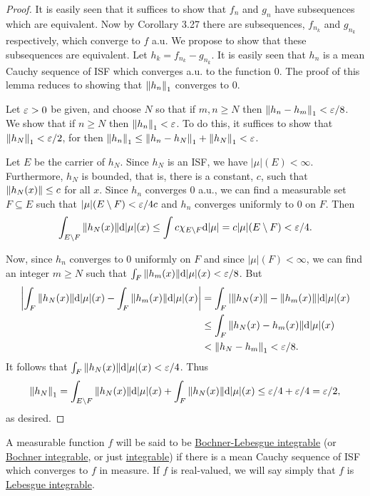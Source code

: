 \begin{proof}
It is easily seen that it suffices to show that $f_n$ and $g_n$ have subsequences which are equivalent. Now by Corollary 3.27 there are subsequences, $f_{n_k}$ and $g_{n_k}$ respectively, which converge to $f$ a.u. We propose to show that these subsequences are equivalent. Let $h_k=f_{n_k}-g_{n_k}$. It is easily seen that $h_n$ is a mean Cauchy sequence of ISF which converges a.u. to the function 0. The proof of this lemma reduces to showing that $\norm{h_n}_1$ converges to $0$.

Let $\varepsilon>0$ be given, and choose $N$ so that if $m,n\geq N$ then $\norm{h_n-h_m}_1<\varepsilon/8$. We show that if $n\geq N$ then $\norm{h_n}_1<\varepsilon$. To do this, it suffices to show that $\norm{h_N}_1<\varepsilon/2$, for then $\norm{h_n}_1\leq\norm{h_n-h_N}_1+\norm{h_N}_1<\varepsilon$.

Let $E$ be the carrier of $h_N$. Since $h_N$ is an ISF, we have $|\mu|(E)<\infty$. Furthermore, $h_N$ is bounded, that is, there is a constant, $c$, such that $\norm{h_N(x)}\leq c$ for all $x$. Since $h_n$ converges $0$ a.u., we can find a measurable set $F\subseteq E$ such that $|\mu|(E\setminus F)<\varepsilon/4c$ and $h_n$ converges uniformly to $0$ on $F$. Then $$\int_{E\setminus F}\norm{h_N(x)}\dd|\mu|(x)\leq\int c\chi_{E\setminus F}\dd|\mu|=c|\mu|(E\setminus F)<\varepsilon/4.$$

Now, since $h_n$ converges to $0$ uniformly on $F$ and since $|\mu|(F)<\infty$, we can find an integer $m\geq N$ such that $\int_F\norm{h_m(x)}\dd|\mu|(x)<\varepsilon/8$. But
\begin{align*}
    \left\lvert\int_F\norm{h_N(x)}\dd|\mu|(x)-\int_F\norm{h_m(x)}\dd|\mu|(x)\right\rvert&=\int_F|\norm{h_N(x)}-\norm{h_m(x)}|\dd|\mu|(x)\\
    &\leq\int_F\norm{h_N(x)-h_m(x)}\dd|\mu|(x)\\
    &<\norm{h_N-h_m}_1<\varepsilon/8.
\end{align*}
It follows that $\int_F\norm{h_N(x)}\dd|\mu|(x)<\varepsilon/4$. Thus $$\norm{h_N}_1=\int_{E\setminus F}\norm{h_N(x)}\dd|\mu|(x)+\int_F\norm{h_N(x)}\dd|\mu|(x)\leq\varepsilon/4+\varepsilon/4=\varepsilon/2,$$ as desired.
\end{proof}

\begin{definition}
A measurable function $f$ will be said to be \underline{Bochner-Lebesgue integrable} (or \underline{Bochner integrable}, or just \underline{integrable}) if there is a mean Cauchy sequence of ISF which converges to $f$ in measure. If $f$ is real-valued, we will say simply that $f$ is \underline{Lebesgue integrable}.
\end{definition}

